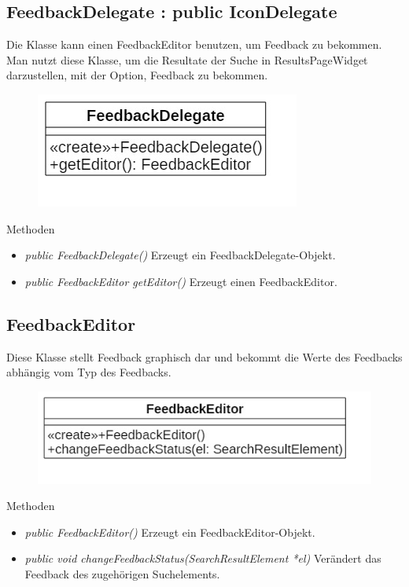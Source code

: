 \subsection*{FeedbackDelegate : public IconDelegate}
Die Klasse kann einen FeedbackEditor benutzen, um Feedback zu bekommen. Man nutzt diese Klasse, um die Resultate der Suche in ResultsPageWidget darzustellen, mit der Option, Feedback zu bekommen. 

\begin{figure}[H]
	\centering
	\includegraphics[scale=0.5]{img/Klassendiagramm/Klassen/View/FeedbackDelegate}
	\label{fig:feedbackDelegate}
\end{figure}

Methoden
\begin{itemize}
	\item\textit{public FeedbackDelegate()}
	Erzeugt ein FeedbackDelegate-Objekt.
	\item\textit{public FeedbackEditor getEditor()}
	Erzeugt einen FeedbackEditor.
\end{itemize}

\subsection*{FeedbackEditor}
Diese Klasse stellt Feedback graphisch dar und bekommt die Werte des Feedbacks abhängig vom Typ des Feedbacks.

\begin{figure}[H]
	\centering
	\includegraphics[scale=0.5]{img/Klassendiagramm/Klassen/View/FeedbackEditor}
	\label{fig:feedbackEditor}
\end{figure}

Methoden
\begin{itemize}
	\item\textit{public FeedbackEditor()}
	Erzeugt ein FeedbackEditor-Objekt.
	\item\textit{public void changeFeedbackStatus(SearchResultElement *el)}
	Verändert das Feedback des zugehörigen Suchelements.
\end{itemize}

